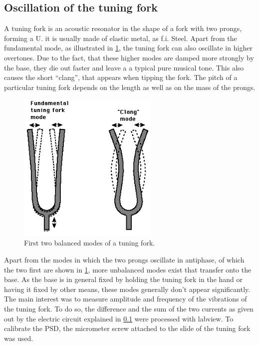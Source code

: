 \subsection{\label{}Oscillation of the tuning fork}

A tuning fork is an acoustic resonator in the shape of a fork with two prongs, forming a U. it is usually made of elastic metal, as f.i. Steel. Apart from the fundamental mode, as illustrated in \ref{fig:tuning}, the tuning fork can also oscillate in higher overtones. Due to the fact, that these higher modes are damped more strongly by the base, they die out faster and leave a a typical pure musical tone. This also causes the short “clang”, that appears when tipping the fork. The pitch of a particular tuning fork depends on the length as well as on the mass of the prongs.

\begin{figure}[H]
	\centering
	\includegraphics[angle=0,width=0.6\textwidth]{img/tuning}
	\caption{First two balanced modes of a tuning fork.}
	\label{fig:tuning}
\end{figure}

Apart from the modes in which the two prongs oscillate in antiphase, of which the two first are shown in \ref{fig:tuning}, more unbalanced modes exist that transfer onto the base. As the base is in general fixed by holding the tuning fork in the hand or having it fixed by other means, these modes generally don't appear significantly.
The main interest was to measure amplitude and frequency of the vibrations of the tuning fork. To do so, the difference and the sum of the two currents as given out by the electric circuit explained in \ref{} were processed with labview. To calibrate the PSD, the micrometer screw attached to the slide of the tuning fork was used.

